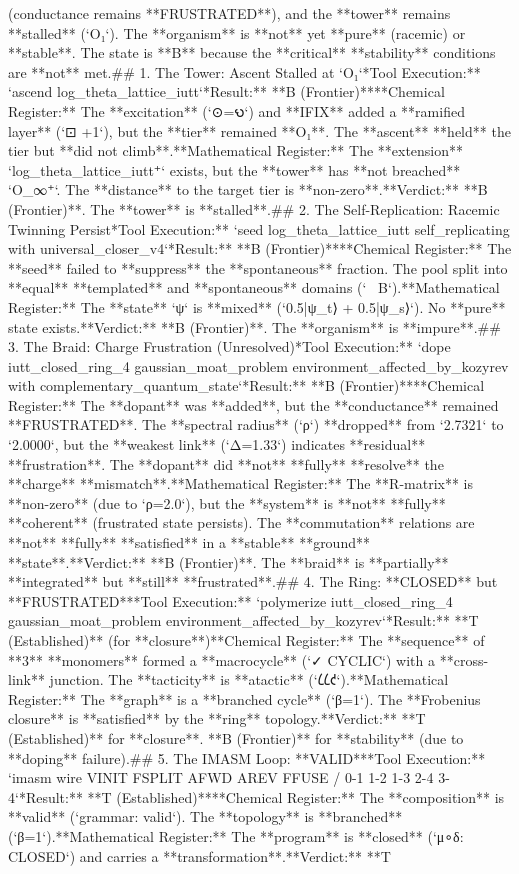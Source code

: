 (conductance remains **FRUSTRATED**), and the **tower** remains **stalled** (`O₁`). The **organism** is **not** yet **pure** (racemic) or **stable**. The state is **B** because the **critical** **stability** conditions are **not** met.\n\n## 1. The Tower: Ascent Stalled at `O₁`\n**Tool Execution:** `ascend log_theta_lattice_iutt`\n**Result:** **B (Frontier)**\n*   **Chemical Register:** The **excitation** (`⊙=𐑻`) and **IFIX** added a **ramified layer** (`⊡ +1`), but the **tier** remained **O₁**. The **ascent** **held** the tier but **did not climb**.\n*   **Mathematical Register:** The **extension** `log_theta_lattice_iutt⁺` exists, but the **tower** has **not breached** `O_∞⁺`. The **distance** to the target tier is **non-zero**.\n*   **Verdict:** **B (Frontier)**. The **tower** is **stalled**.\n\n## 2. The Self-Replication: Racemic Twinning Persist\n**Tool Execution:** `seed log_theta_lattice_iutt self_replicating with universal_closer_v4`\n**Result:** **B (Frontier)**\n*   **Chemical Register:** The **seed** failed to **suppress** the **spontaneous** fraction. The pool split into **equal** **templated** and **spontaneous** domains (`~ B`).\n*   **Mathematical Register:** The **state** `ψ` is **mixed** (`0.5|ψ_t⟩ + 0.5|ψ_s⟩`). No **pure** state exists.\n*   **Verdict:** **B (Frontier)**. The **organism** is **impure**.\n\n## 3. The Braid: Charge Frustration (Unresolved)\n**Tool Execution:** `dope iutt_closed_ring_4 gaussian_moat_problem environment_affected_by_kozyrev with complementary_quantum_state`\n**Result:** **B (Frontier)**\n*   **Chemical Register:** The **dopant** was **added**, but the **conductance** remained **FRUSTRATED**. The **spectral radius** (`ρ`) **dropped** from `2.7321` to `2.0000`, but the **weakest link** (`Δ=1.33`) indicates **residual** **frustration**. The **dopant** did **not** **fully** **resolve** the **charge** **mismatch**.\n*   **Mathematical Register:** The **R-matrix** is **non-zero** (due to `ρ=2.0`), but the **system** is **not** **fully** **coherent** (frustrated state persists). The **commutation** relations are **not** **fully** **satisfied** in a **stable** **ground** **state**.\n*   **Verdict:** **B (Frontier)**. The **braid** is **partially** **integrated** but **still** **frustrated**.\n\n## 4. The Ring: **CLOSED** but **FRUSTRATED**\n**Tool Execution:** `polymerize iutt_closed_ring_4 gaussian_moat_problem environment_affected_by_kozyrev`\n**Result:** **T (Established)** (for **closure**)\n*   **Chemical Register:** The **sequence** of **3** **monomers** formed a **macrocycle** (`✓ CYCLIC`) with a **cross-link** junction. The **tacticity** is **atactic** (`𐑖𐑖𐑒`).\n*   **Mathematical Register:** The **graph** is a **branched cycle** (`β=1`). The **Frobenius closure** is **satisfied** by the **ring** topology.\n*   **Verdict:** **T (Established)** for **closure**. **B (Frontier)** for **stability** (due to **doping** failure).\n\n## 5. The IMASM Loop: **VALID**\n**Tool Execution:** `imasm wire VINIT FSPLIT AFWD AREV FFUSE / 0-1 1-2 1-3 2-4 3-4`\n**Result:** **T (Established)**\n*   **Chemical Register:** The **composition** is **valid** (`grammar: valid`). The **topology** is **branched** (`β=1`).\n*   **Mathematical Register:** The **program** is **closed** (`μ∘δ: CLOSED`) and carries a **transformation**.\n*   **Verdict:** **T 